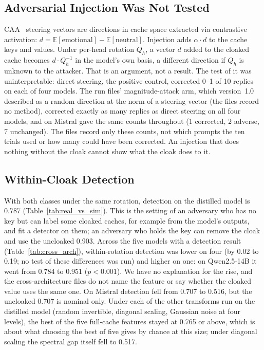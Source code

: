 \documentclass[11pt,a4paper]{article}
\begin{document}
\subsection{Adversarial Injection Was Not Tested}

CAA~\citep{panickssery2023caa} steering vectors are directions in cache space extracted via
contrastive activation: $d = \mathbb{E}[\text{emotional}] -
\mathbb{E}[\text{neutral}]$. Injection adds $\alpha \cdot d$ to the
cache keys and values. Under per-head rotation $Q_h$, a vector $d$ added
to the cloaked cache becomes $d \cdot Q_h^{-1}$ in the model's own basis,
a different direction if $Q_h$ is unknown to the attacker. That is an
argument, not a result. The test of it was uninterpretable: direct
steering, the positive control, corrected 0--1 of 10 replies on each of
four models. The run files' magnitude-attack arm, which version~1.0
described as a random direction at the norm of a steering vector (the
files record no method), corrected exactly as many replies as direct
steering on all four models, and on Mistral gave the same counts
throughout (1 corrected, 2 adverse, 7 unchanged). The files record only
these counts, not which prompts the ten trials used or how many could have
been corrected. An injection that does nothing without the cloak cannot
show what the cloak does to it.

\subsection{Within-Cloak Detection}
\label{sec:withincloak}

With both classes under the same rotation, detection on the distilled
model is 0.787 (Table~\ref{tab:real_vs_sim}). This is the setting of an
adversary who has no key but can label some cloaked caches, for example
from the model's outputs, and fit a detector on them; an adversary who
holds the key can remove the cloak and use the uncloaked 0.903. Across the
five models with a detection result (Table~\ref{tab:cross_arch}),
within-rotation detection was lower on four (by 0.02 to 0.19; no test of
these differences was run) and higher on one: on Qwen2.5-14B it went from
0.784 to 0.951 ($p < 0.001$). We have no explanation for the rise, and
the cross-architecture files do not name the feature or say whether the
cloaked value uses the same one. On Mistral detection fell from 0.707 to
0.516, but the uncloaked 0.707 is nominal only. Under each of the other
transforms run on the distilled model (random invertible, diagonal
scaling, Gaussian noise at four levels), the best of the five full-cache
features stayed at 0.765 or above, which is about what choosing the best
of five gives by chance at this size; under diagonal scaling the spectral
gap itself fell to 0.517.
\end{document}
